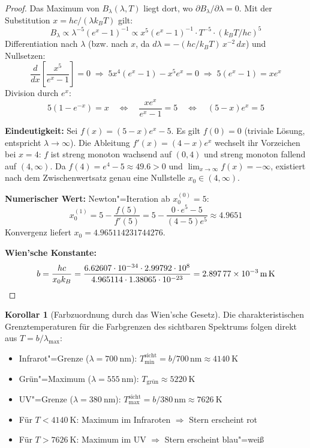 ﻿\documentclass[a4paper,12pt]{article}
\theoremstyle{definition}
\newtheorem{korollar}{Korollar}
\begin{document}
\begin{proof}
    Das Maximum von $B_\lambda(\lambda, T)$ liegt dort, wo
    $\partial B_\lambda / \partial\lambda = 0$. Mit der Substitution
    $x = hc/(\lambda k_B T)$ gilt:
    \[
        B_\lambda \propto \lambda^{-5}(e^x-1)^{-1}
        \propto x^5 (e^x-1)^{-1} \cdot T^{-5} \cdot (k_BT/hc)^5
    \]
    Differentiation nach $\lambda$ (bzw. nach $x$, da
    $d\lambda = -(hc/k_BT)\,x^{-2}\,dx$) und Nullsetzen:
    \[
        \frac{d}{dx}\!\left[\frac{x^5}{e^x-1}\right] = 0
        \;\Longrightarrow\;
        5x^4(e^x-1) - x^5 e^x = 0
        \;\Longrightarrow\;
        5(e^x-1) = x e^x
    \]
    Division durch $e^x$:
    \[
        5(1 - e^{-x}) = x
        \quad\Longleftrightarrow\quad
        \frac{x e^x}{e^x - 1} = 5
        \quad\Longleftrightarrow\quad
        (5-x)e^x = 5
        \label{eq:wien_eq}
    \]

    \textbf{Eindeutigkeit:} Sei $f(x) = (5-x)e^x - 5$.
    Es gilt $f(0) = 0$ (triviale Lösung, entspricht $\lambda \to \infty$).
    Die Ableitung $f'(x) = (4-x)e^x$ wechselt ihr Vorzeichen bei $x = 4$:
    $f$ ist streng monoton wachsend auf $(0,4)$ und streng monoton fallend
    auf $(4,\infty)$. Da $f(4) = e^4 - 5 \approx 49.6 > 0$ und
    $\lim_{x\to\infty} f(x) = -\infty$, existiert nach dem Zwischenwertsatz
    genau eine Nullstelle $x_0 \in (4,\infty)$.

    \textbf{Numerischer Wert:} Newton"=Iteration ab $x_0^{(0)} = 5$:
    \[
        x_0^{(1)} = 5 - \frac{f(5)}{f'(5)} = 5 - \frac{0 \cdot e^5 - 5}{(4-5)e^5}
        \approx 4.9651
    \]
    Konvergenz liefert $x_0 = 4.965114231744276$.

    \textbf{Wien'sche Konstante:}
    \[
        b = \frac{hc}{x_0 k_B}
        = \frac{6.62607\cdot10^{-34} \cdot 2.99792\cdot10^8}
               {4.965114 \cdot 1.38065\cdot10^{-23}}
        = \SI{2.89777e-3}{\metre\kelvin} \qedhere
    \]
\end{proof}

\begin{korollar}[Farbzuordnung durch das Wien'sche Gesetz]
\label{kor:farbe}
    Die charakteristischen Grenztemperaturen für die Farbgrenzen des
    sichtbaren Spektrums folgen direkt aus $T = b/\lambda_{\max}$:
    \begin{itemize}
        \item Infrarot"=Grenze ($\lambda = \SI{700}{\nano\metre}$):
              $T_{\min}^{\text{sicht}} = b/700\,\text{nm} \approx \SI{4140}{\kelvin}$
        \item Grün"=Maximum ($\lambda = \SI{555}{\nano\metre}$):
              $T_{\text{grün}} \approx \SI{5220}{\kelvin}$
        \item UV"=Grenze ($\lambda = \SI{380}{\nano\metre}$):
              $T_{\max}^{\text{sicht}} = b/380\,\text{nm} \approx \SI{7626}{\kelvin}$
        \item Für $T < \SI{4140}{\kelvin}$: Maximum im Infraroten
              $\Rightarrow$ Stern erscheint rot
        \item Für $T > \SI{7626}{\kelvin}$: Maximum im UV
              $\Rightarrow$ Stern erscheint blau"=weiß
    \end{itemize}
\end{korollar}
\end{document}
